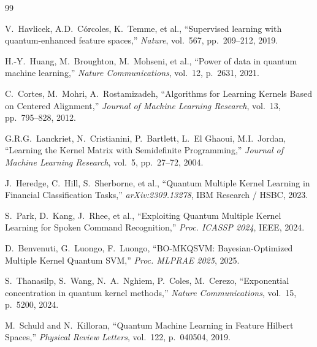 \documentclass[12pt,a4paper]{article}
\begin{document}
\newpage
\begin{thebibliography}{99}

V.~Havlicek, A.D.~C{\'o}rcoles, K.~Temme, et al.,
``Supervised learning with quantum-enhanced feature spaces,''
\textit{Nature}, vol.~567, pp.~209--212, 2019.

H.-Y.~Huang, M.~Broughton, M.~Mohseni, et al.,
``Power of data in quantum machine learning,''
\textit{Nature Communications}, vol.~12, p.~2631, 2021.

C.~Cortes, M.~Mohri, A.~Rostamizadeh,
``Algorithms for Learning Kernels Based on Centered Alignment,''
\textit{Journal of Machine Learning Research}, vol.~13, pp.~795--828, 2012.

G.R.G.~Lanckriet, N.~Cristianini, P.~Bartlett, L.~El Ghaoui, M.I.~Jordan,
``Learning the Kernel Matrix with Semidefinite Programming,''
\textit{Journal of Machine Learning Research}, vol.~5, pp.~27--72, 2004.

J.~Heredge, C.~Hill, S.~Sherborne, et al.,
``Quantum Multiple Kernel Learning in Financial Classification Tasks,''
\textit{arXiv:2309.13278}, IBM Research / HSBC, 2023.

S.~Park, D.~Kang, J.~Rhee, et al.,
``Exploiting Quantum Multiple Kernel Learning for Spoken Command Recognition,''
\textit{Proc. ICASSP 2024}, IEEE, 2024.

D.~Benvenuti, G.~Luongo, F.~Luongo,
``BO-MKQSVM: Bayesian-Optimized Multiple Kernel Quantum SVM,''
\textit{Proc. MLPRAE 2025}, 2025.

S.~Thanasilp, S.~Wang, N.~A.~Nghiem, P.~Coles, M.~Cerezo,
``Exponential concentration in quantum kernel methods,''
\textit{Nature Communications}, vol.~15, p.~5200, 2024.

M.~Schuld and N.~Killoran,
``Quantum Machine Learning in Feature Hilbert Spaces,''
\textit{Physical Review Letters}, vol.~122, p.~040504, 2019.

\end{thebibliography}
\end{document}
